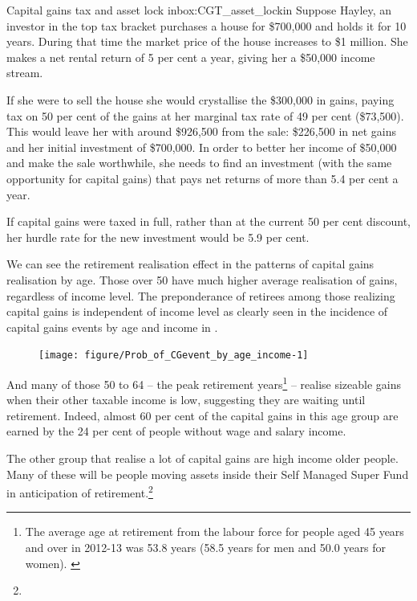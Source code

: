 \documentclass{grattan}\usepackage[]{graphicx}\usepackage[]{color}
\newcommand\gao{Grattan analysis of}
\begin{document}
\begin{smallbox}{Capital gains tax and asset lock in}{box:CGT_asset_lockin}
Suppose Hayley, an investor in the top tax bracket purchases a house for \$700,000 and holds it for 10 years. During that time the market price of the house increases to \$1 million. She makes a net rental return of 5 per cent a year, giving her a \$50,000 income stream. 

If she were to sell the house she would crystallise the \$300,000 in gains, paying tax on 50 per cent of the gains at her marginal tax rate of 49 per cent (\$73,500). This would leave her with around \$926,500 from the sale: \$226,500 in net gains and her initial investment of \$700,000. In order to better her income of \$50,000 and make the sale worthwhile, she needs to find an investment (with the same opportunity for capital gains) that pays net returns of more than 5.4 per cent a year.

If capital gains were taxed in full, rather than at the current 50 per cent discount, her hurdle rate for the new investment would be 5.9 per cent. 
\end{smallbox}

We can see the retirement realisation effect in the patterns of capital gains realisation by age. Those over 50 have much higher average realisation of gains, regardless of income level. The preponderance of retirees among those realizing capital gains is independent of income level as clearly seen in the incidence of capital gains events by age and income in .


\begin{figure}[t]
\texttt{[image: figure/Prob\_of\_CGevent\_by\_age\_income-1]}
\source{\gao\ \textcite{ATO2013i}}
\end{figure}
And many of those 50 to 64 -- the peak retirement years\footnote{The average age at retirement from the labour force for people aged 45 years and over in 2012-13 was 53.8 years (58.5 years for men and 50.0 years for women). \textcite{ABS2013}} -- realise sizeable gains when their other taxable income is low, suggesting they are waiting until retirement. Indeed, almost 60 per cent of the capital gains in this age group are earned by the 24 per cent of people without wage and salary income. 

The other group that realise a lot of capital gains are high income older people. Many of these will be people moving assets inside their Self Managed Super Fund in anticipation of retirement.\footnote{}
\end{document}
